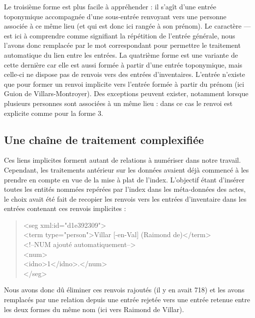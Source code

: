 \documentclass[a4paper,12pt,twoside]{book}
\begin{document}
	Le troisième forme est plus facile à appréhender : il s'agît d'une entrée toponymique accompagnée d'une sous-entrée renvoyant vers une personne associée à ce même lieu (et qui est donc ici rangée à son prénom). Le caractère \og —\fg{} est ici à comprendre comme signifiant la répétition de l'entrée générale, nous l'avons donc remplacée par le mot correspondant pour permettre le traitement automatique du lien entre les entrées. La quatrième forme est une variante de cette dernière car elle est aussi formée à partir d'une entrée toponymique, mais celle-ci ne dispose pas de renvois vers des entrées d'inventaires. L'entrée n'existe que pour former un renvoi implicite vers l'entrée formée à partir du prénom (ici \og Guion de Villars-Montroyer\fg{}). Des exceptions peuvent exister, notamment lorsque plusieurs personnes sont associées à un même lieu : dans ce cas le renvoi est explicite comme pour la forme 3.
	
	\subsection{Une chaîne de traitement complexifiée}
	
	Ces liens implicites forment autant de relations à numériser dans notre travail. Cependant, les traitements antérieur sur les données avaient déjà commencé à les prendre en compte en vue de la mise à plat de l'index. L'objectif étant d'insérer toutes les entités nommées repérées par l'index dans les méta-données des actes, le choix avait été fait de recopier les renvois vers les entrées d'inventaire dans les entrées contenant ces renvois implicites :
	
	\pagebreak
	
	\begin{quotation}
               <seg xml:id="d1e392309">\\
				\indent\indent<term type="person">Villar [-en-Val] (Raimond de)</term>\\
				\indent\indent<!--NUM ajouté automatiquement-->\\
				\indent{}\\
				\indent\indent\indent<idno>1</idno>.</num>\\
				\indent</seg>
	\end{quotation}
	
	
	\noindent Nous avons donc dû éliminer ces renvois rajoutés (il y en avait 718) et les avons remplacés par une relation depuis une entrée rejetée vers une entrée retenue entre les deux formes du même nom (ici vers \og Raimond de Villar\fg{}).
	
\end{document}
